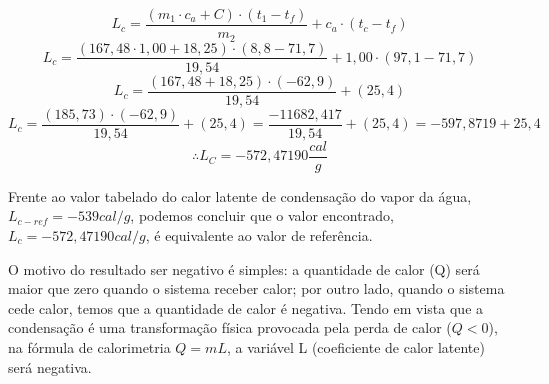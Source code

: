 \[ L_c = \frac{(m_1 \cdot c_a + C) \cdot (t_1 - t_f)}{m_2} + c_a \cdot (t_c - t_f)\]
\[ L_c = \frac{(167,48 \cdot 1,00 + 18,25) \cdot (8,8 - 71,7)}{19,54} + 1,00 \cdot (97,1 - 71,7)\]
\[ L_c = \frac{(167,48 + 18,25) \cdot (- 62,9)}{19,54} + (25,4)\]
\[ L_c = \frac{(185,73) \cdot (- 62,9)}{19,54} + (25,4) = \frac{-11682,417}{19,54} + (25,4) = -597,8719 + 25,4\]
\[\therefore L_C = -572,47190 \frac{cal}{g}\]

Frente ao valor tabelado do calor latente de condensação do vapor da água, $L_{c-ref}= -539 cal/g$, podemos concluir que o valor encontrado, $L_c= -572,47190 cal/g$, é equivalente ao valor de referência.

O motivo do resultado ser negativo é simples: a quantidade de calor (Q) será maior que zero quando o sistema receber calor; por outro lado, quando o sistema cede calor, temos que a quantidade de calor é negativa. Tendo em vista que a condensação é uma transformação física provocada pela perda de calor ($Q < 0$), na fórmula de calorimetria $Q = mL$, a variável L (coeficiente de calor latente) será negativa.
